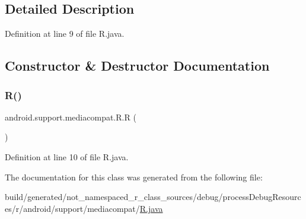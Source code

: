 \subsection{Detailed Description}


Definition at line 9 of file R.\+java.



\subsection{Constructor \& Destructor Documentation}
\mbox{\label{classandroid_1_1support_1_1mediacompat_1_1_r_a57c7ac186b73e61e21481806c097f290}} 
\subsubsection{\texorpdfstring{R()}{R()}}
{\footnotesize\ttfamily android.\+support.\+mediacompat.\+R.\+R (\begin{DoxyParamCaption}{ }\end{DoxyParamCaption})\hspace{0.3cm}{\ttfamily [private]}}



Definition at line 10 of file R.\+java.


\begin{DoxyCode}{0}

\end{DoxyCode}


The documentation for this class was generated from the following file\+:\begin{DoxyCompactItemize}
\item 
build/generated/not\+\_\+namespaced\+\_\+r\+\_\+class\+\_\+sources/debug/process\+Debug\+Resources/r/android/support/mediacompat/\mbox{\hyperlink{android_2support_2mediacompat_2_r_8java}{R.\+java}}\end{DoxyCompactItemize}
